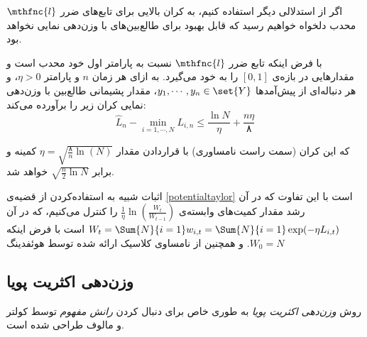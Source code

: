 اگر از استدلالی دیگر استفاده کنیم، به کران بالایی برای تابع‌های ضرر
$\mthfnc{l}$ 
محدب دلخواه خواهیم رسید که قابل بهبود برای طالع‌بین‌‌های با وزن‌دهی نمایی نخواهد بود.
\begin{theorem}
با فرض اینکه تابع ضرر 
$\mthfnc{l}$ 
نسبت به پارامتر اول خود محدب است و مقدارهایی در بازه‌ی 
$[0,1]$ 
را به خود می‌گیرد. به ازای هر زمان 
$n$ 
و پارامتر 
$\eta > 0$، 
و هر دنباله‌ای از پیش‌آمدها 
$y_1, \cdots, y_n \in \set{Y}$، 
مقدار پشیمانی طالع‌بین با وزن‌دهی نمایی کران زیر را برآورده می‌کند:
\[
\hat{L}_n - \min_{i=1,\cdots,N} L_{i,n} \leq \frac{\ln N}{\eta} + \frac{n \eta}{۸}
\]

که این کران (سمت راست نامساوری) با قراردادن مقدار 
$\eta = \sqrt{ \frac{۸}{n} \ln(N) }$ 
کمینه و برابر 
$\sqrt{\frac{n}{2}\ln N}$ 
خواهد شد.
\end{theorem}

اثبات شبیه به استفاده‌کردن از قضیه‌ی 
\ref{potentialtaylor} 
است با این تفاوت که در آن رشد مقدار کمیت‌های وابسته‌ی 
$\frac{1}{\eta} \ln \left( \frac{W_t}{W_{t-1}} \right)$ 
را کنترل می‌کنیم، که در آن 
$W_t = \Sum{N}{i=1} w_{i,t} = \Sum{N}{i=1} \exp( -\eta L_{i,t} )$ 
است با فرض اینکه 
$W_0 = N$. 
و همچنین از نامساوی کلاسیک ارائه شده توسط هوئفدینگ






















\subsection{
وزن‌دهی اکثریت پویا
}
روش 
\textit{
وزن‌دهی اکثریت پویا
} 
به طوری خاص برای دنبال کردن 
\textit{
رانش مفهوم
} 
توسط کولتر و مالوف
\cite{koltermaloof2003} 
طراحی شده است. 







% 











































